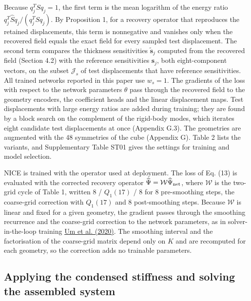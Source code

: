 \documentclass[preprint,12pt,authoryear]{elsarticle}
\begin{document}
Because \(q_j^TSq_j=1\), the first term is the mean logarithm of the energy ratio \(q_j^T\widehat Sq_j/(q_j^TSq_j)\). By Proposition 1, for a recovery operator that reproduces the retained displacements, this term is nonnegative and vanishes only when the recovered field equals the exact field for every sampled test displacement. The second term compares the thickness sensitivities \(\widetilde{\boldsymbol s}_j\) computed from the recovered field (Section 4.2) with the reference sensitivities \(\boldsymbol s_j\), both eight-component vectors, on the subset \(\mathcal J_s\) of test displacements that have reference sensitivities. All trained networks reported in this paper use \(w_s=1\). The gradients of the loss with respect to the network parameters \(\theta\) pass through the recovered field to the geometry encoders, the coefficient heads and the linear displacement maps. Test displacements with large energy ratios are added during training; they are found by a block search on the complement of the rigid-body modes, which iterates eight candidate test displacements at once (Appendix G.3). The geometries are augmented with the 48 symmetries of the cube (Appendix G). Table 2 lists the variants, and Supplementary Table ST01 gives the settings for training and model selection.

NICE is trained with the operator used at deployment. The loss of Eq. (13) is evaluated with the corrected recovery operator \(\widehat\Psi=\mathcal W\widehat\Psi_{\rm net}\), where \(\mathcal W\) is the two-grid cycle of Table 1, written 8 / \(Q_1(17)\) / 8 for 8 pre-smoothing steps, the coarse-grid correction with \(Q_1(17)\) and 8 post-smoothing steps. Because \(\mathcal W\) is linear and fixed for a given geometry, the gradient passes through the smoothing recurrence and the coarse-grid correction to the network parameters, as in solver-in-the-loop training \href{https://proceedings.neurips.cc/paper/2020/hash/43e4e6a6f341e00671e123714de019a8-Abstract.html}{Um et al. (2020)}. The smoothing interval and the factorisation of the coarse-grid matrix depend only on \(K\) and are recomputed for each geometry, so the correction adds no trainable parameters.

\subsection{Applying the condensed stiffness and solving the assembled system}
\end{document}
